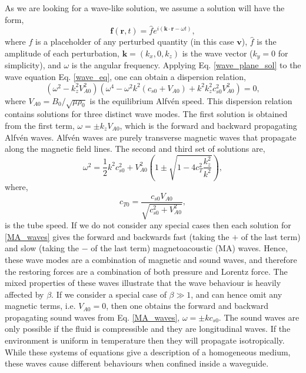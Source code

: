 \documentclass[12pt]{ociamthesis}
\newcommand{\bs}[1]{\boldsymbol{#1}}
\newcommand{\eref}[1]{Eq. \eqref{#1}}
\newcommand{\Alfven}{Alfv\'{e}n }
\begin{document}
As we are looking for a wave-like solution, we assume a solution will have the form,
\begin{equation}\label{wave_plane_sol}
    \bs{f}(\bs{r},t) = \hat{f} e^{i( \bs{k}\cdot \bs{r} - \omega t)},
\end{equation}
where $f$ is a placeholder of any perturbed quantity (in this case $\bs{v}$), $\hat{f}$ is the amplitude of each perturbation, $\bs{k}=(k_x,0,k_z)$ is the wave vector ($k_y=0$ for simplicity), and $\omega$ is the angular frequency. Applying \eref{wave_plane_sol} to the wave equation \eref{wave_eq}, one can obtain a dispersion relation,
\begin{equation}\label{disp_rel}
 (\omega^2-k^2_z V_{A0}^2)(\omega^4-\omega^2k^2(c_{s0}+V_{A0})+k^2 k^2_z c_{s0}^2 V_{A0}^2) = 0,
\end{equation}
where $V_{A0}=B_0/\sqrt{\mu \rho_0}$ is the equilibrium \Alfven speed. This dispersion relation contains solutions for three distinct wave modes. The first solution is obtained from the first term, $\omega=\pm k_z V_{A0}$, which is the forward and backward propagating \Alfven waves. \Alfven waves are purely transverse magnetic waves that propagate along the magnetic field lines. The second and third set of solutions are,
\begin{equation}\label{MA_waves}
    \omega^2 = \frac{1}{2} k^2{c_{s0}^2+V_{A0}^2} \left( 1 \pm \sqrt{1-4c^2_T \frac{ k^2_z}{k^2}}  \right),
\end{equation}
where, 
\begin{equation}
  c_{T0} = \frac{c_{s0}V_{A0}}{\sqrt{c_{s0}^2+V_{A0}^2}}, 
\end{equation}
is the tube speed. If we do not consider any special cases then each solution for \eqref{MA_waves} gives the forward and backwards fast (taking the $+$ of the last term) and slow (taking the $-$ of the last term) magnetoacoustic (MA) waves. Hence, these wave modes are a combination of magnetic and sound waves, and therefore the restoring forces are a combination of both pressure and Lorentz force. The mixed properties of these waves illustrate that the wave behaviour is heavily affected by $\beta$. If we consider a special case of $\beta \gg 1$, and can hence omit any magnetic terms, i.e. $V_{A0}=0$, then one obtains the forward and backward propagating sound waves from \eref{MA_waves}, $\omega = \pm k c_{s0}$. The sound waves are only possible if the fluid is compressible and they are longitudinal waves. If the environment is uniform in temperature then they will propagate isotropically. While these systems of equations give a description of a homogeneous medium, these waves cause different behaviours when confined inside a waveguide.
\end{document}
